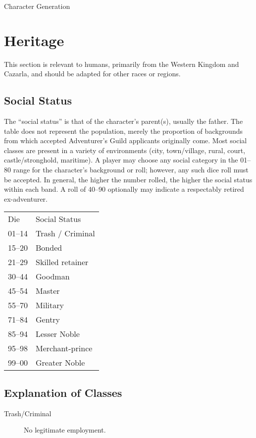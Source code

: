 \begin{Chapter}{Character Generation}
\section{Heritage}
\label{heritage}

This section is relevant to humans, primarily from the Western Kingdom
and Cazarla, and should be adapted for other races or regions.

\subsection{Social Status}

The “social status” is that of the character’s parent(s), usually the
father. The table does not represent the population, merely the
proportion of backgrounds from which accepted Adventurer’s Guild
applicants originally come. Most social classes are present in a
variety of environments (city, town/village, rural, court,
castle/stronghold, maritime).  A player may choose any social category
in the 01--80 range for the character’s background or roll; however,
any such dice roll must be accepted.  In general, the higher the
number rolled, the higher the social status within each band. A roll
of 40--90 optionally may indicate a respectably retired ex-adventurer.

\begin{tabularx}{\columnwidth}{lX}
Die	& Social Status \\
01--14	& Trash / Criminal \\
15--20	& Bonded \\
21--29	& Skilled retainer \\
30--44	& Goodman \\
45--54	& Master \\
55--70	& Military \\
71--84	& Gentry \\
85--94	& Lesser Noble \\
95--98	& Merchant-prince \\ 
99--00	& Greater Noble \\
\end{tabularx}

\subsection{Explanation of Classes}

\begin{description}

\item[Trash/Criminal] No legitimate employment. 


\end{description}
\end{Chapter}
